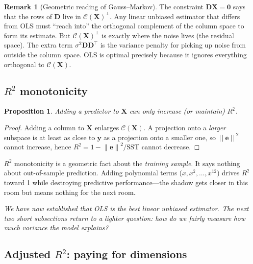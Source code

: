 \documentclass[11pt,a4paper]{article}
\theoremstyle{plain}
\newtheorem{proposition}[theorem]{Proposition}
\theoremstyle{definition}
\newtheorem{remark}[theorem]{Remark}
\newcommand{\bX}{\bm{X}}
\newcommand{\by}{\bm{y}}
\newcommand{\be}{\bm{e}}
\newcommand{\bD}{\bm{D}}
\newcommand{\Col}{\mathcal{C}}
\newcommand{\norm}[1]{\left\lVert #1 \right\rVert}
\begin{document}
\begin{remark}[Geometric reading of Gauss--Markov]
The constraint $\bD\bX = \bm{0}$ says that the rows of $\bD$ live in
$\Col(\bX)^\perp$.  Any linear unbiased estimator that differs from OLS
must ``reach into'' the orthogonal complement of the column space to
form its estimate.  But $\Col(\bX)^\perp$ is exactly where the noise lives
(the residual space).  The extra term $\sigma^2\bD\bD^\top$ is the
variance penalty for picking up noise from outside the column space.
OLS is optimal precisely because it ignores everything orthogonal to
$\Col(\bX)$.
\end{remark}

\subsection{$R^2$ monotonicity}

\begin{proposition}\label{prop:r2mono}
Adding a predictor to $\bX$ can only increase (or maintain) $R^2$.
\end{proposition}

\begin{proof}
Adding a column to $\bX$ enlarges $\Col(\bX)$.
A projection onto a \emph{larger} subspace is at least as close to
$\by$ as a projection onto a smaller one, so $\norm{\be}^2$ cannot
increase, hence $R^2 = 1 - \norm{\be}^2/\text{SST}$ cannot decrease.
\end{proof}

\begin{warning}
$R^2$ monotonicity is a geometric fact about the \emph{training sample}.
It says nothing about out-of-sample prediction.
Adding polynomial terms ($x, x^2,\dots,x^{12}$) drives $R^2$ toward 1
while destroying predictive performance---the shadow gets closer in this
room but means nothing for the next room.
\end{warning}

\medskip
\noindent\textit{We have now established that OLS is the best linear unbiased estimator.
The next two short subsections return to a lighter question: how do we
fairly measure how much variance the model explains?}

\subsection{Adjusted $R^2$: paying for dimensions}\label{sec:adj-r2}
\end{document}
